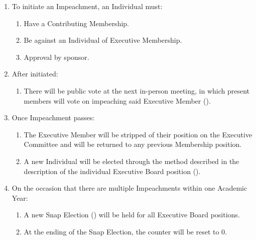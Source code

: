 
\begin{enumerate}
	\item To initiate an Impeachment, an Individual must:
		\begin{enumerate}
			\item Have a Contributing Membership.

			\item Be against an Individual of Executive Membership.

			\item Approval by sponsor.
		\end{enumerate}

	\item After initiated:
		\begin{enumerate}
			\item There will be public vote at the next in-person meeting, in which
				present members will vote on impeaching said Executive Member ().

		\end{enumerate}

	\item Once Impeachment passes:
		\begin{enumerate}
			\item The Executive Member will be stripped of their position on the Executive
				Committee and will be returned to any previous Membership position.

			\item A new Individual will be elected through the method described in the
				description of the individual Executive Board position ().
		\end{enumerate}

	\item On the occasion that there are multiple Impeachments within one Academic
		Year:
		\begin{enumerate}
			\item A new Snap Election () will be held for
				all Executive Board positions.

			\item At the ending of the Snap Election, the counter will be reset to 0.
		\end{enumerate}
\end{enumerate}

